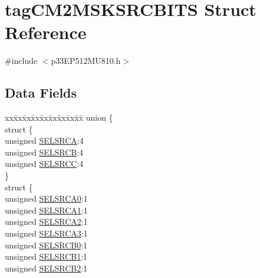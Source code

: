 \hypertarget{structtag_c_m2_m_s_k_s_r_c_b_i_t_s}{}\section{tag\+C\+M2\+M\+S\+K\+S\+R\+C\+B\+I\+TS Struct Reference}
\label{structtag_c_m2_m_s_k_s_r_c_b_i_t_s}


{\ttfamily \#include $<$p33\+E\+P512\+M\+U810.\+h$>$}

\subsection*{Data Fields}
\begin{DoxyCompactItemize}
\item 
\begin{tabbing}
xx\=xx\=xx\=xx\=xx\=xx\=xx\=xx\=xx\=\kill
union \{\\
\>struct \{\\
\>\>unsigned \hyperlink{structtag_c_m2_m_s_k_s_r_c_b_i_t_s_a71efbbcc07c5589abbdc8fbc64bb43b7}{SELSRCA}:4\\
\>\>unsigned \hyperlink{structtag_c_m2_m_s_k_s_r_c_b_i_t_s_a732414962412dfa9aa0a35c8acdf7441}{SELSRCB}:4\\
\>\>unsigned \hyperlink{structtag_c_m2_m_s_k_s_r_c_b_i_t_s_adb722d9a00c9d716af69dbadf03f066b}{SELSRCC}:4\\
\>\} \\
\>struct \{\\
\>\>unsigned \hyperlink{structtag_c_m2_m_s_k_s_r_c_b_i_t_s_a4f44ef494908be7240123901bbcd0235}{SELSRCA0}:1\\
\>\>unsigned \hyperlink{structtag_c_m2_m_s_k_s_r_c_b_i_t_s_aa42e5e64574e7f78278952e37052babd}{SELSRCA1}:1\\
\>\>unsigned \hyperlink{structtag_c_m2_m_s_k_s_r_c_b_i_t_s_a8e046d28e2f14c607d33a0126ad11f85}{SELSRCA2}:1\\
\>\>unsigned \hyperlink{structtag_c_m2_m_s_k_s_r_c_b_i_t_s_aa6a1c05a91e9d2a1114d06b8effb0eaf}{SELSRCA3}:1\\
\>\>unsigned \hyperlink{structtag_c_m2_m_s_k_s_r_c_b_i_t_s_a5c1da19a6275a00280765b4def3ea9a9}{SELSRCB0}:1\\
\>\>unsigned \hyperlink{structtag_c_m2_m_s_k_s_r_c_b_i_t_s_a99130b1cce6df5fb6cc53450953c64f5}{SELSRCB1}:1\\
\>\>unsigned \hyperlink{structtag_c_m2_m_s_k_s_r_c_b_i_t_s_a8b560e65c1713248c6b69d161849b4b4}{SELSRCB2}:1\\

\end{tabbing}
\end{DoxyCompactItemize}

